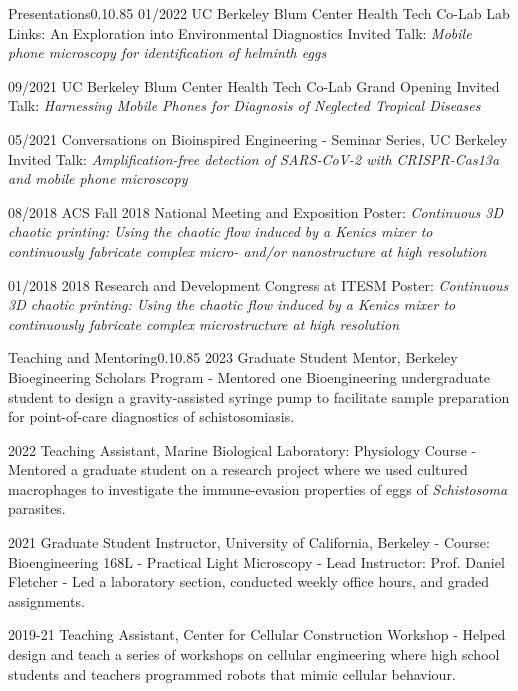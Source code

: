 \documentclass{federico_cv}
\begin{document}
\begin{tblSection}{Presentations}{0.1}{0.85}
\leftbfrightsingle
{01/2022}
{UC Berkeley Blum Center Health Tech Co-Lab Lab Links: An Exploration into Environmental Diagnostics}
{Invited Talk: \textit{Mobile phone microscopy for identification of helminth eggs}}

\leftbfrightsingle
{09/2021}
{UC Berkeley Blum Center Health Tech Co-Lab Grand Opening}
{Invited Talk: \textit{Harnessing Mobile Phones for Diagnosis of Neglected Tropical Diseases}}

\leftbfrightsingle
{05/2021}
{Conversations on Bioinspired Engineering - Seminar Series, UC Berkeley}
{Invited Talk: \textit{Amplification-free detection of SARS-CoV-2 with CRISPR-Cas13a and mobile phone microscopy}}

\leftbfrightsinglenobreak
{08/2018}
{ACS Fall 2018 National Meeting and Exposition}
{Poster: \textit{Continuous 3D chaotic printing: Using the chaotic flow induced by a Kenics mixer to continuously fabricate complex micro- and/or nanostructure at high resolution}}

\leftbfrightsingle
{01/2018}
{2018 Research and Development Congress at ITESM}
{Poster: \textit{Continuous 3D chaotic printing: Using the chaotic flow induced by a Kenics mixer to continuously fabricate complex microstructure at high resolution}}

\end{tblSection}



\begin{tblSection}{Teaching and Mentoring}{0.1}{0.85}
\leftbfrightsingle
{2023}
{Graduate Student Mentor, Berkeley Bioegineering Scholars Program}
{- Mentored one Bioengineering undergraduate student to design a gravity-assisted syringe pump to facilitate sample preparation for point-of-care diagnostics of schistosomiasis.}

\leftbfrightsingle
{2022}
{Teaching Assistant, Marine Biological Laboratory: Physiology Course}
{- Mentored a graduate student on a research project where we used cultured macrophages to investigate the immune-evasion properties of eggs of \textit{Schistosoma} parasites.}


\leftbfrightsingle
{2021}
{Graduate Student Instructor, University of California, Berkeley}
{- Course: Bioengineering 168L - Practical Light Microscopy}
{- Lead Instructor: Prof. Daniel Fletcher}
{- Led a laboratory section, conducted weekly office hours, and graded assignments.}

\leftbfrightsingle
{2019-21}
{Teaching Assistant, Center for Cellular Construction Workshop}
{- Helped design and teach a series of workshops on cellular engineering where high school students and teachers programmed robots that mimic cellular behaviour.}

\end{tblSection}
\end{document}

